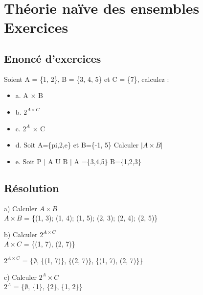 \newpage

\section{Théorie naïve des ensembles Exercices}
\vspace{5mm} %

\subsection{Enoncé d'exercices}

Soient A = \{1, 2\}, B = \{3, 4, 5\} et C = \{7\}, calculez : \\

\begin{itemize}
\item {a. A × B}
\item {b. $2^{A×C}$}
\item {c. $2^{A}$ × C}
\item {d. Soit A=\{pi,2,e\} et B=\{-1, 5\} Calculer ${|A\times B|}$}
\item {e. Soit P $|$ A U B $|$ A =\{3,4,5\} B=\{1,2,3\}}
\end{itemize}

\subsection{Résolution}
\vspace{4mm} %

a) Calculer ${A\times B}$ \\

$A \times B$ = \{(1, 3); (1, 4); (1, 5); (2, 3); (2, 4); (2, 5)\} \\
\vspace{5mm} %

b) Calculer $2^{A×C}$ \\

$A \times C$ = \{(1, 7), (2, 7)\}
\vspace{5mm} %

$2^{A×C}$ = \{$\emptyset$, \{(1, 7)\}, \{(2, 7)\}, \{(1, 7), (2, 7)\}\} \\
\vspace{5mm} %

c) Calculer $2^{A}×C$ \\

$2^{A}$ =  \{$\emptyset$, \{1\}, \{2\}, \{1, 2\}\} \\


